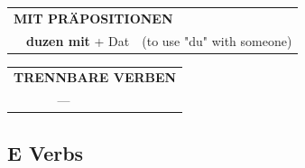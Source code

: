 \documentclass[10pt,a4paper]{revtex4-2}
\begin{document}
\begin{verbbox}
\vspace{10pt}

\begin{tabular}{lll}
\multicolumn{3}{l}{\textbf{MIT PRÄPOSITIONEN}}\\
& \textbf{duzen mit} + Dat & (to use "du" with someone)\\
\end{tabular}
\hfill
\begin{tabular}{lll}
\multicolumn{3}{l}{\textbf{TRENNBARE VERBEN}}\\
& ---\\
\end{tabular}
\vspace{-5pt}
\end{verbbox}

\subsection{E Verbs}
\end{document}
